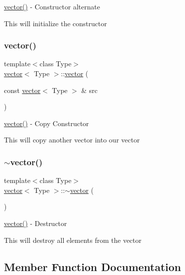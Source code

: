 \hyperlink{classvector_ab8d8ebaa9b91a05bb7a94371cb84c042}{vector()} -\/ Constructor alternate 

This will initialize the constructor \hypertarget{classvector_a09bcb733130a4b75eab388d79a6ad1c6}{}\label{classvector_a09bcb733130a4b75eab388d79a6ad1c6} 
\subsubsection{\texorpdfstring{vector()}{vector()}\hspace{0.1cm}{\footnotesize\ttfamily [3/3]}}
{\footnotesize\ttfamily template$<$class Type$>$ \\
\hyperlink{classvector}{vector}$<$ Type $>$\+::\hyperlink{classvector}{vector} (\begin{DoxyParamCaption}\item[{const \hyperlink{classvector}{vector}$<$ Type $>$ \&}]{src }\end{DoxyParamCaption})\hspace{0.3cm}{\ttfamily [inline]}}



\hyperlink{classvector_ab8d8ebaa9b91a05bb7a94371cb84c042}{vector()} -\/ Copy Constructor 

This will copy another vector into our vector \hypertarget{classvector_af6ca21dc63ee5974d306c5c4ad104294}{}\label{classvector_af6ca21dc63ee5974d306c5c4ad104294} 
\subsubsection{\texorpdfstring{$\sim$vector()}{~vector()}}
{\footnotesize\ttfamily template$<$class Type$>$ \\
\hyperlink{classvector}{vector}$<$ Type $>$\+::$\sim$\hyperlink{classvector}{vector} (\begin{DoxyParamCaption}{ }\end{DoxyParamCaption})\hspace{0.3cm}{\ttfamily [inline]}}



\hyperlink{classvector_ab8d8ebaa9b91a05bb7a94371cb84c042}{vector()} -\/ Destructor 

This will destroy all elements from the vector 

\subsection{Member Function Documentation}
\hypertarget{classvector_a1a2e2bce9c55489fc3c65ea6956a8c8d}{}\label{classvector_a1a2e2bce9c55489fc3c65ea6956a8c8d} 
